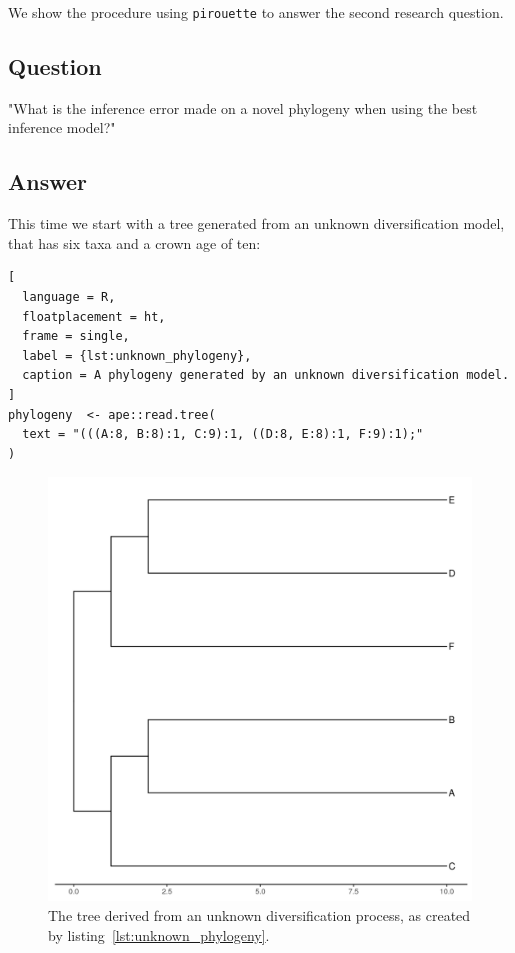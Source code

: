 \documentclass{article}
\begin{document}
We show the procedure using \verb;pirouette; to answer the second research 
question.

\subsection{Question}

"What is the inference error made on a novel phylogeny when
using the best inference model?"

\subsection{Answer}

This time we start with a tree generated from an unknown 
diversification model, that has six taxa and a crown age of ten:

\begin{lstlisting}[
  language = R, 
  floatplacement = ht,
  frame = single, 
  label = {lst:unknown_phylogeny},
  caption = A phylogeny generated by an unknown diversification model.
]
phylogeny  <- ape::read.tree(
  text = "(((A:8, B:8):1, C:9):1, ((D:8, E:8):1, F:9):1);"
)
\end{lstlisting}
\begin{figure}[H]
  \includegraphics[width=\textwidth]{example_2/tree_unknown.png}
  \caption{The tree derived from an unknown diversification process, 
    as created by listing~\ref{lst:unknown_phylogeny}.
  }
\end{figure}
\end{document}

